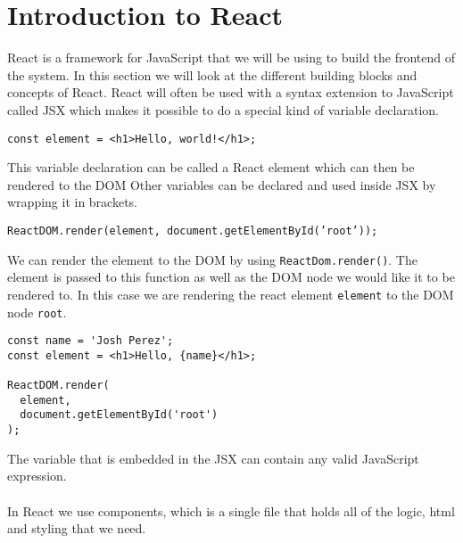 \section{Introduction to React}
React is a framework for JavaScript that we will be using to build the frontend of the system. 
In this section we will look at the different building blocks and concepts of React.
React will often be used with a syntax extension to JavaScript called JSX which makes it possible to do a special kind of variable declaration.

\begin{center}
    \texttt{const element = <h1>Hello, world!</h1>;}
\end{center}
This variable declaration can be called a React element which can then be rendered to the DOM
Other variables can be declared and used inside JSX by wrapping it in brackets.
\begin{center}
    \texttt{ReactDOM.render(element, document.getElementById('root'));}
\end{center}
We can render the element to the DOM by using \texttt{ReactDom.render()}. The element is passed to this function as well as the DOM node we would like it to be rendered to. In this case we are rendering the react element \texttt{element} to the DOM node \texttt{root}.
\begin{lstlisting}
const name = 'Josh Perez';
const element = <h1>Hello, {name}</h1>;

ReactDOM.render(
  element,
  document.getElementById('root')
);
\end{lstlisting}
The variable that is embedded in the JSX can contain any valid JavaScript expression.
\\\\
In React we use components, which is a single file that holds all of the logic, html and styling that we need.

